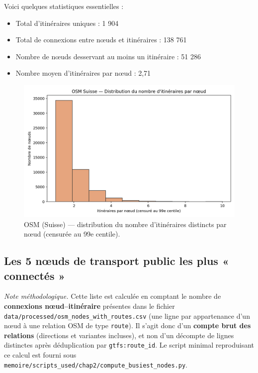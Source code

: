 Voici quelques statistiques essentielles :

\begin{itemize}
    \item Total d'itinéraires uniques : 1 904  
    \item Total de connexions entre nœuds et itinéraires : 138 761  
    \item Nombre de nœuds desservant au moins un itinéraire : 51 286  
    \item Nombre moyen d'itinéraires par nœud : 2,71  
\end{itemize}

\begin{figure}[H]
  \centering
  \includegraphics[width=.8\linewidth]{figures/plots/osm_routes_per_node_hist.png}
  \caption[Distribution des itinéraires par nœud]{OSM (Suisse) — distribution du nombre d'itinéraires distincts par nœud (censurée au 99e centile).}
  \label{fig:osm_routes_per_node_hist}
\end{figure}



\subsection{Les 5 nœuds de transport public les plus « connectés »}

\noindent\textit{Note méthodologique.} Cette liste est calculée en comptant le nombre de \textbf{connexions nœud–itinéraire} présentes dans le fichier \texttt{data/processed/osm\_nodes\_with\_routes.csv} (une ligne par appartenance d’un nœud à une relation OSM de type \texttt{route}). Il s’agit donc d’un \textbf{compte brut des relations} (directions et variantes incluses), et non d’un décompte de lignes distinctes après déduplication par \texttt{gtfs:route\_id}. Le script minimal reproduisant ce calcul est fourni sous \texttt{memoire/scripts\_used/chap2/compute\_busiest\_nodes.py}.

